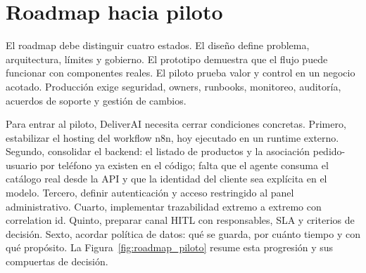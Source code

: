 \section{Roadmap hacia piloto}

El roadmap debe distinguir cuatro estados. El diseño define problema, arquitectura, límites y gobierno. El prototipo demuestra que el flujo puede funcionar con componentes reales. El piloto prueba valor y control en un negocio acotado. Producción exige seguridad, owners, runbooks, monitoreo, auditoría, acuerdos de soporte y gestión de cambios.

Para entrar al piloto, DeliverAI necesita cerrar condiciones concretas. Primero, estabilizar el hosting del workflow n8n, hoy ejecutado en un runtime externo. Segundo, consolidar el backend: el listado de productos y la asociación pedido-usuario por teléfono ya existen en el código; falta que el agente consuma el catálogo real desde la API y que la identidad del cliente sea explícita en el modelo. Tercero, definir autenticación y acceso restringido al panel administrativo. Cuarto, implementar trazabilidad extremo a extremo con correlation id. Quinto, preparar canal HITL con responsables, SLA y criterios de decisión. Sexto, acordar política de datos: qué se guarda, por cuánto tiempo y con qué propósito. La Figura~\ref{fig:roadmap_piloto} resume esta progresión y sus compuertas de decisión.

